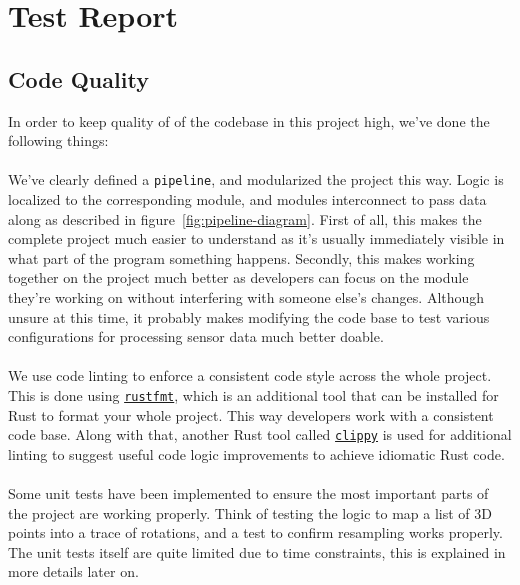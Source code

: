 \documentclass{standalone}
\begin{document}
  \section{Test Report}
  \subsection{Code Quality}
  In order to keep quality of of the codebase in this project high, we've done
  the following things:

  \paragraph{}
  We've clearly defined a \verb_pipeline_, and modularized the project this way.
  Logic is localized to the corresponding module, and modules interconnect to
  pass data along as described in figure~\ref{fig:pipeline-diagram}.
  First of all, this makes the complete project much easier to
  understand as it's usually immediately visible in what part of the program
  something happens. Secondly, this makes working together on the project much
  better as developers can focus on the module they're working on without
  interfering with someone else's changes. Although unsure at this time,
  it probably makes modifying the code base to test various configurations for
  processing sensor data much better doable.

  \paragraph{}
  We use code linting to enforce a consistent code style across the whole
  project. This is done using
  \href{https://github.com/rust-lang-nursery/rustfmt}{\verb_rustfmt_},
  which is an additional tool that can be installed for Rust to format your
  whole project. This way developers work with a consistent code base. Along
  with that, another Rust tool called
  \href{https://github.com/rust-lang-nursery/rust-clippy}{\verb_clippy_}
  is used for additional linting to suggest useful code logic improvements to
  achieve idiomatic Rust code.

  \paragraph{}
  Some unit tests have been implemented to ensure the most important parts of
  the project are working properly. Think of testing the logic to map a list of
  3D points into a trace of rotations, and a test to confirm resampling works
  properly. The unit tests itself are quite limited due to time constraints,
  this is explained in more details later on.
\end{document}
